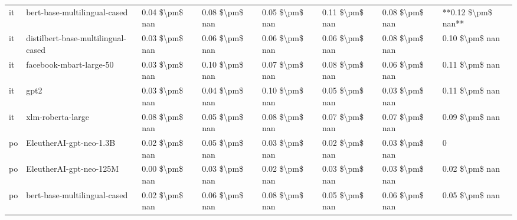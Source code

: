 \begin{tabular}{llllllll}
      it &       bert-base-multilingual-cased & 0.04 \$\textbackslash pm\$ nan &            0.08 \$\textbackslash pm\$ nan &        0.05 \$\textbackslash pm\$ nan &         0.11 \$\textbackslash pm\$ nan &                          0.08 \$\textbackslash pm\$ nan & **0.12 \$\textbackslash pm\$ nan** \\
      it & distilbert-base-multilingual-cased & 0.03 \$\textbackslash pm\$ nan &            0.06 \$\textbackslash pm\$ nan &        0.06 \$\textbackslash pm\$ nan &         0.06 \$\textbackslash pm\$ nan &                          0.08 \$\textbackslash pm\$ nan &     0.10 \$\textbackslash pm\$ nan \\
      it &            facebook-mbart-large-50 & 0.03 \$\textbackslash pm\$ nan &            0.10 \$\textbackslash pm\$ nan &        0.07 \$\textbackslash pm\$ nan &         0.08 \$\textbackslash pm\$ nan &                          0.06 \$\textbackslash pm\$ nan &     0.11 \$\textbackslash pm\$ nan \\
      it &                               gpt2 & 0.03 \$\textbackslash pm\$ nan &            0.04 \$\textbackslash pm\$ nan &        0.10 \$\textbackslash pm\$ nan &         0.05 \$\textbackslash pm\$ nan &                          0.03 \$\textbackslash pm\$ nan &     0.11 \$\textbackslash pm\$ nan \\
      it &                  xlm-roberta-large & 0.08 \$\textbackslash pm\$ nan &            0.05 \$\textbackslash pm\$ nan &        0.08 \$\textbackslash pm\$ nan &         0.07 \$\textbackslash pm\$ nan &                          0.07 \$\textbackslash pm\$ nan &     0.09 \$\textbackslash pm\$ nan \\
      po &            EleutherAI-gpt-neo-1.3B & 0.02 \$\textbackslash pm\$ nan &            0.05 \$\textbackslash pm\$ nan &        0.03 \$\textbackslash pm\$ nan &         0.02 \$\textbackslash pm\$ nan &                          0.03 \$\textbackslash pm\$ nan &                  0 \\
      po &            EleutherAI-gpt-neo-125M & 0.00 \$\textbackslash pm\$ nan &            0.03 \$\textbackslash pm\$ nan &        0.02 \$\textbackslash pm\$ nan &         0.03 \$\textbackslash pm\$ nan &                          0.03 \$\textbackslash pm\$ nan &     0.02 \$\textbackslash pm\$ nan \\
      po &       bert-base-multilingual-cased & 0.02 \$\textbackslash pm\$ nan &            0.06 \$\textbackslash pm\$ nan &        0.08 \$\textbackslash pm\$ nan &         0.05 \$\textbackslash pm\$ nan &                          0.06 \$\textbackslash pm\$ nan &     0.05 \$\textbackslash pm\$ nan \\

\end{tabular}
